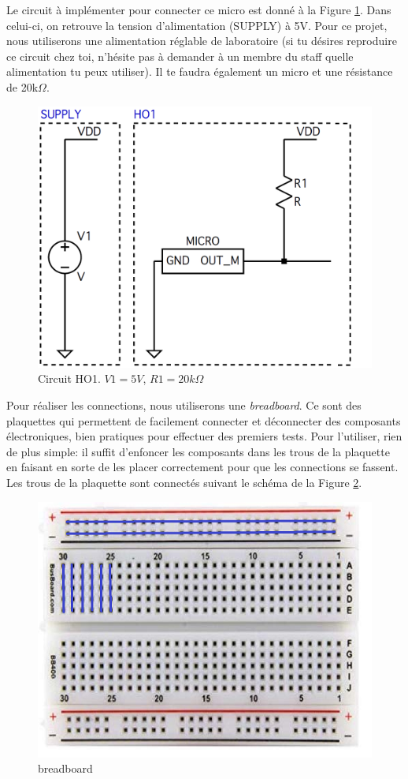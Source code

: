 Le circuit à implémenter pour connecter ce micro est donné à la Figure \ref{fig:circuit_H01}. Dans celui-ci, on retrouve la tension d'alimentation (\textsc{SUPPLY}) à 5V. Pour ce projet, nous utiliserons une alimentation réglable de laboratoire (si tu désires reproduire ce circuit chez toi, n'hésite pas à demander à un membre du staff quelle alimentation tu peux utiliser). Il te faudra également un micro et une résistance de 20k$\Omega$. 

\begin{figure}[!ht]
	\centering
	\includegraphics[width=.65\textwidth]{figures/circuit_1.png}
	\caption{Circuit HO1. $V1 = 5V$, $R1 = 20 k\Omega$}
	\label{fig:circuit_H01}
\end{figure}

Pour réaliser les connections, nous utiliserons une \textit{breadboard}. Ce sont des plaquettes qui permettent de facilement connecter et déconnecter des composants électroniques, bien pratiques pour effectuer des premiers tests. Pour l'utiliser, rien de plus simple: il suffit d'enfoncer les composants dans les trous de la plaquette en faisant en sorte de les placer correctement pour que les connections se fassent. Les trous de la plaquette sont connectés suivant le schéma de la Figure \ref{fig:breadboard}.

\begin{figure}[!ht]
	\centering
	\includegraphics[width=.5\textwidth]{figures/breadboard.PNG}
	\caption{breadboard}
	\label{fig:breadboard}
\end{figure}
